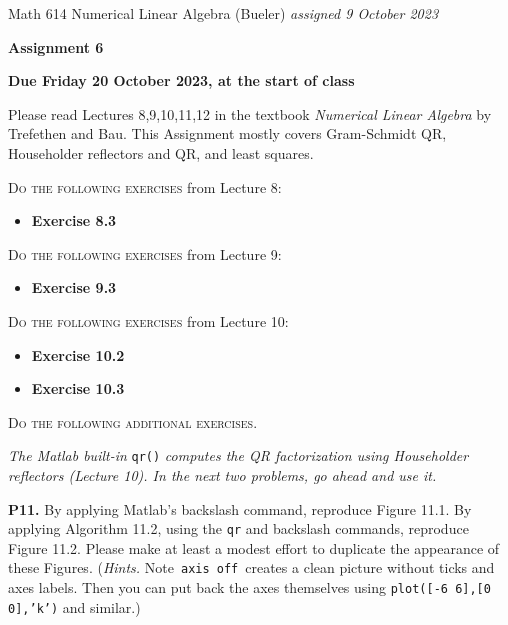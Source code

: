 \documentclass[12pt]{amsart}
\newcommand{\prob}[1]{\bigskip\noindent\textbf{#1.}\quad }
\begin{document}
\scriptsize \noindent Math 614 Numerical Linear Algebra (Bueler) \hfill \emph{assigned 9 October 2023}
\normalsize\medskip

\Large\centerline{\textbf{Assignment 6}}
\large
\medskip

\centerline{\textbf{Due Friday 20 October 2023, at the start of class}}
\medskip
\normalsize

\thispagestyle{empty}

\bigskip
\noindent Please read Lectures 8,9,10,11,12 in the textbook \emph{Numerical Linear Algebra} by Trefethen and Bau.  This Assignment mostly covers Gram-Schmidt QR, Householder reflectors and QR, and least squares.

\bigskip
\noindent \textsc{Do the following exercises} from Lecture 8:

\begin{itemize}
\item \textbf{Exercise 8.3}
\end{itemize}

\bigskip
\noindent \textsc{Do the following exercises} from Lecture 9:

\begin{itemize}
\item \textbf{Exercise 9.3}
\end{itemize}

\bigskip
\noindent \textsc{Do the following exercises} from Lecture 10:

\begin{itemize}
\item \textbf{Exercise 10.2}
\item \textbf{Exercise 10.3}
\end{itemize}


\bigskip
\noindent \textsc{Do the following additional exercises.}

\medskip
\noindent \emph{The Matlab built-in} \texttt{qr()} \emph{computes the QR factorization using Householder reflectors (Lecture 10).  In the next two problems, go ahead and use it.}

\prob{P11}  By applying Matlab's backslash command, reproduce Figure 11.1.  By applying Algorithm 11.2, using the \texttt{qr} and backslash commands, reproduce Figure 11.2.  Please make at least a modest effort to duplicate the appearance of these Figures.  (\emph{Hints.}  Note \,\texttt{axis off}\, creates a clean picture without ticks and axes labels.  Then you can put back the axes themselves using \texttt{plot([-6 6],[0 0],'k')} and similar.)
\end{document}
